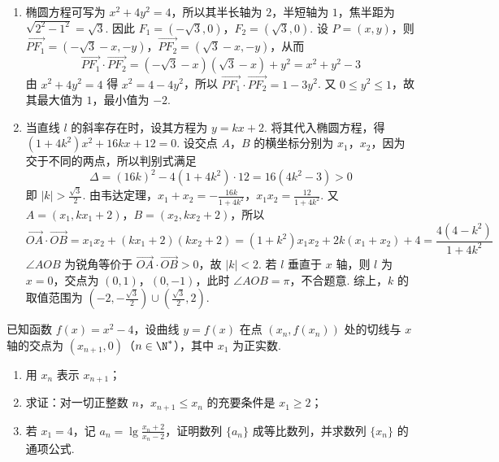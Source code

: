 \begin{solution}
\begin{enumerate}
\item 椭圆方程可写为 \(x^2+4y^2=4\)，所以其半长轴为 \(2\)，半短轴为 \(1\)，焦半距为 \(\sqrt{2^2-1^2}=\sqrt{3}\). 因此 \(F_1=(-\sqrt{3},0)\)，\(F_2=(\sqrt{3},0)\). 设 \(P=(x,y)\)，则 \(\overrightarrow{PF_1}=(-\sqrt{3}-x,-y)\)，\(\overrightarrow{PF_2}=(\sqrt{3}-x,-y)\)，从而
\[
\overrightarrow{PF_1}\cdot\overrightarrow{PF_2}=(-\sqrt{3}-x)(\sqrt{3}-x)+y^2=x^2+y^2-3
\]
由 \(x^2+4y^2=4\) 得 \(x^2=4-4y^2\)，所以 \(\overrightarrow{PF_1}\cdot\overrightarrow{PF_2}=1-3y^2\). 又 \(0\leqslant y^2\leqslant1\)，故其最大值为 \(1\)，最小值为 \(-2\).
\item 当直线 \(l\) 的斜率存在时，设其方程为 \(y=kx+2\). 将其代入椭圆方程，得 \((1+4k^2)x^2+16kx+12=0\). 设交点 \(A\)，\(B\) 的横坐标分别为 \(x_1\)，\(x_2\)，因为交于不同的两点，所以判别式满足
\[
\Delta=(16k)^2-4(1+4k^2)\cdot12=16(4k^2-3)>0
\]
即 \(|k|>\frac{\sqrt{3}}{2}\). 由韦达定理，\(x_1+x_2=-\frac{16k}{1+4k^2}\)，\(x_1x_2=\frac{12}{1+4k^2}\). 又 \(A=(x_1,kx_1+2)\)，\(B=(x_2,kx_2+2)\)，所以
\[
\overrightarrow{OA}\cdot\overrightarrow{OB}=x_1x_2+(kx_1+2)(kx_2+2)=(1+k^2)x_1x_2+2k(x_1+x_2)+4=\frac{4(4-k^2)}{1+4k^2}
\]
\(\angle AOB\) 为锐角等价于 \(\overrightarrow{OA}\cdot\overrightarrow{OB}>0\)，故 \(|k|<2\). 若 \(l\) 垂直于 \(x\) 轴，则 \(l\) 为 \(x=0\)，交点为 \((0,1)\)，\((0,-1)\)，此时 \(\angle AOB=\pi\)，不合题意. 综上，\(k\) 的取值范围为 \(\left(-2,-\frac{\sqrt{3}}{2}\right)\cup\left(\frac{\sqrt{3}}{2},2\right)\).
\end{enumerate}
\end{solution}

\begin{problem}
已知函数 \(f(x) = x^2 - 4\)，设曲线 \(y = f(x)\) 在点 \((x_n, f(x_n))\) 处的切线与 \(x\) 轴的交点为 \((x_{n+1}, 0)\)（\(n \in \N^{*}\)），其中 \(x_1\) 为正实数.

\begin{enumerate}
\item 用 \(x_n\) 表示 \(x_{n+1}\)；
\item 求证：对一切正整数 \(n\)，\(x_{n+1} \leqslant x_n\) 的充要条件是 \(x_1 \geqslant 2\)；
\item 若 \(x_1 = 4\)，记 \(a_n = \lg \frac{x_n + 2}{x_n - 2}\)，证明数列 \(\{a_n\}\) 成等比数列，并求数列 \(\{x_n\}\) 的通项公式.
\end{enumerate}
\end{problem}

